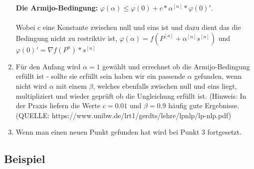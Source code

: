 \documentclass[a4paper, 11pt]{article}
\begin{document}
\begin{enumerate}
      \textbf{Die Armijo-Bedingung:} $\varphi(\alpha) \leq \varphi(0) + c * \alpha^{[n]} * \varphi(0)'$. \\\\
      Wobei $c$ eine Konstante zwischen null und eins ist und dazu dient das die Bedingung nicht zu restriktiv ist, $\varphi(\alpha) = f(P^{[n]} + \alpha^{[n]}s^{[n]})$ und $\varphi(0)' = {\nabla}f(P^{n}) * s^{[n]}$
      \item
      Für den Anfang wird $\alpha=1$ gewählt und errechnet ob die Armijo-Bedingung erfüllt ist - sollte sie erfüllt sein haben wir ein passende $\alpha$ gefunden, wenn nicht wird $\alpha$ mit einem $\beta$, welches ebenfalls zwischen null und eins liegt, multipliziert und wieder geprüft ob die Ungleichung erfüllt ist. (Hinweis: In der Praxis liefern die Werte $c = 0.01$ und $\beta = 0.9$ häufig gute Ergebnisse. (QUELLE: https://www.unibw.de/lrt1/gerdts/lehre/lpnlp/lp-nlp.pdf)
      \item
      Wenn man einen neuen Punkt gefunden hat wird bei Punkt 3 fortgesetzt.
      
      
\end{enumerate}

\subsection{Beispiel}
\end{document}

